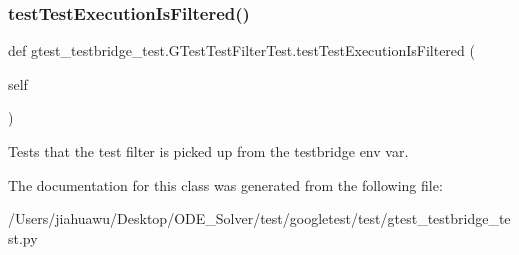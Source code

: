 \subsubsection{\texorpdfstring{test\+Test\+Execution\+Is\+Filtered()}{testTestExecutionIsFiltered()}}
{\footnotesize\ttfamily def gtest\+\_\+testbridge\+\_\+test.\+G\+Test\+Test\+Filter\+Test.\+test\+Test\+Execution\+Is\+Filtered (\begin{DoxyParamCaption}\item[{}]{self }\end{DoxyParamCaption})}

\begin{DoxyVerb}Tests that the test filter is picked up from the testbridge env var.\end{DoxyVerb}
 

The documentation for this class was generated from the following file\+:\begin{DoxyCompactItemize}
\item 
/\+Users/jiahuawu/\+Desktop/\+O\+D\+E\+\_\+\+Solver/test/googletest/test/gtest\+\_\+testbridge\+\_\+test.\+py\end{DoxyCompactItemize}
